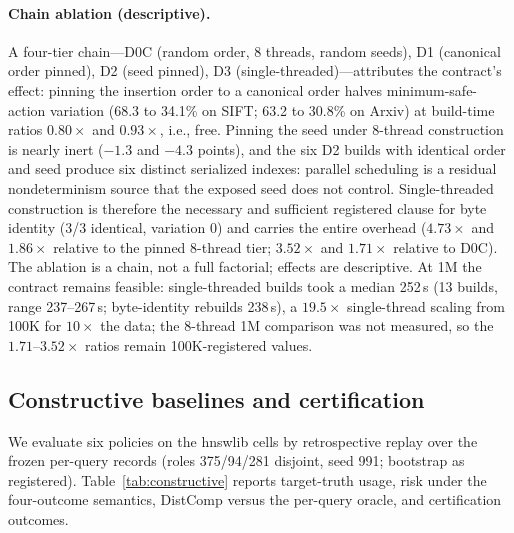 \documentclass{article}
\begin{document}
\paragraph{Chain ablation (descriptive).}
A four-tier chain---D0C (random order, 8 threads, random seeds), D1 (canonical order pinned), D2 (seed
pinned), D3 (single-threaded)---attributes the contract's effect: pinning the insertion order to a
canonical order halves minimum-safe-action variation (68.3 to 34.1\% on SIFT; 63.2 to 30.8\% on Arxiv) at
build-time ratios $0.80\times$ and $0.93\times$, i.e., free. Pinning the seed under 8-thread construction is
nearly inert ($-1.3$ and $-4.3$ points), and the six D2 builds with identical order and seed produce six
distinct serialized indexes: parallel scheduling is a residual nondeterminism source that the exposed seed
does not control. Single-threaded construction is therefore the necessary and sufficient registered clause
for byte identity (3/3 identical, variation 0) and carries the entire overhead ($4.73\times$ and
$1.86\times$ relative to the pinned 8-thread tier; $3.52\times$ and $1.71\times$ relative to D0C). The
ablation is a chain, not a full factorial; effects are descriptive. At 1M the contract remains feasible:
single-threaded builds took a median 252\,s (13 builds, range 237--267\,s; byte-identity rebuilds 238\,s),
a $19.5\times$ single-thread scaling from 100K for $10\times$ the data; the 8-thread 1M comparison was
not measured, so the $1.71$--$3.52\times$ ratios remain 100K-registered values.

\subsection{Constructive baselines and certification}
\label{sec:constructive}

We evaluate six policies on the hnswlib cells by retrospective replay over the frozen per-query records
(roles 375/94/281 disjoint, seed 991; bootstrap as registered). Table~\ref{tab:constructive} reports
target-truth usage, risk under the four-outcome semantics, DistComp versus the per-query oracle, and
certification outcomes.
\end{document}

